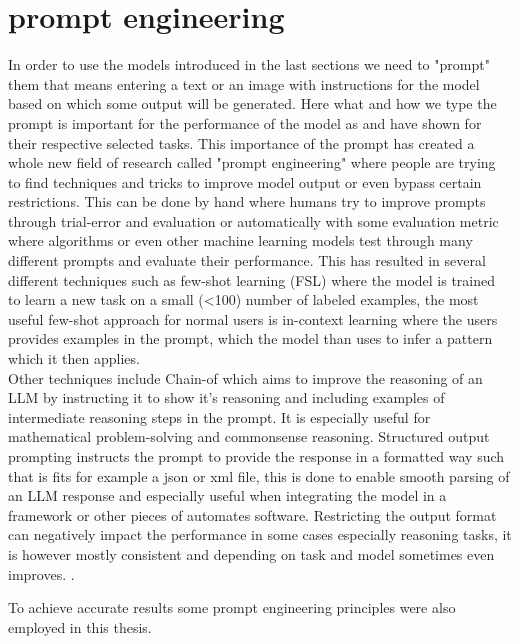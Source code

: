 \documentclass[
  a4paper,  %
  twoside,  %
  bibliography=totoc,
  headsepline,
  cleardoublepage=empty,
  parskip=half,
  draft=false
]{scrbook}
\begin{document}
\section{prompt engineering}
In order to use the models introduced in the last sections we need to "prompt" them that means entering a text or an image with instructions for the model based on which some output will be generated. Here what and how we type the prompt is important for the performance of the model as  \cite{zhang2025understandingrelationshippromptsresponse} and \cite{li2024effectsdifferentpromptsquality} have shown for their respective selected tasks. This importance of the prompt has created a whole new field of research called "prompt engineering" where people are trying to find techniques and tricks to improve model output or even bypass certain restrictions. This can be done by hand where humans try to improve prompts through trial-error and evaluation or automatically with some evaluation metric where algorithms or even other machine learning models test through many different prompts and evaluate their performance. This has resulted in several different techniques such as few-shot learning (FSL) \cite{few-shot} where the model is trained to learn a new task on a small (<100) number of labeled examples, the most useful few-shot approach for normal users is in-context learning \cite{in-context-learning} where the users provides examples in the prompt, which the model than uses to infer a pattern which it then applies. \\ Other techniques include Chain-of \cite{chain-of-thought} which aims to improve the reasoning of an LLM by instructing it to show it's reasoning and including examples of intermediate reasoning steps in the prompt. It is especially useful for mathematical problem-solving and commonsense reasoning. Structured output prompting instructs the prompt to provide the response in a formatted way such that is fits for example a json or xml file, this is done to enable smooth parsing of an LLM response and especially useful when integrating the model in a framework or other pieces of automates software. Restricting the output format can negatively impact the performance in some cases especially reasoning tasks, it is however mostly consistent and depending on task and model sometimes even improves. \cite{tam2024letspeakfreelystudy}.

To achieve accurate results some prompt engineering principles were also employed in this thesis.
\end{document}
